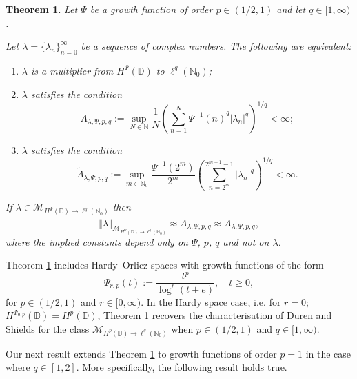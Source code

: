 \documentclass[a4paper, leqno, 10pt]{amsart}
\numberwithin{equation}{section}
\newtheorem{thm}{Theorem}
\newcommand{\norm}[1]{\left\Vert#1\right\Vert}
\newcommand{\D}{\mathbb{D}}
\newcommand{\N}{\mathbb{N}}
\begin{document}
\begin{thm}\label{gen_mult_p<1}
Let $\Psi$ be a growth function of order $p \in (1/2,1)$ and let $q \in [1, \infty)$. 

Let $\lambda = \{ \lambda_n \}_{n=0}^{\infty}$ be a sequence of complex numbers. The following are equivalent:
\begin{enumerate} 
\item  $\lambda$ is a multiplier from $H^{\Psi}(\D)$ to $\ell^q (\N_0)  $;
\item $\lambda$ satisfies the condition
\[
A_{\lambda, \Psi, p, q} := \sup_{N \in \N} \frac{1}{N} \left( \sum_{n=1}^N {\Psi^{-1}(n)}^q  |\lambda_n|^q \right)^{1/q} < \infty ;
\]
\item $\lambda$ satisfies the condition
\[
\widetilde{A}_{\lambda, \Psi, p,  q} := \sup_{m \in \N_0} \frac{\Psi^{-1}(2^m)} {2^m} \left( \sum_{n=2^m}^{2^{m+1}-1} |\lambda_n|^q \right)^{1/q} < \infty .
\]
\end{enumerate}
If $\lambda \in \mathcal{M}_{H^{\Psi}(\D) \rightarrow \ell^q (\N_0)}$ then
\[
\norm{ \lambda }_{\mathcal{M}_{H^{\Psi}(\D) \rightarrow \ell^q (\N_0)}} \approx A_{\lambda, \Psi, p, q} \approx \widetilde{A}_{\lambda, \Psi, p, q} ,
\]
where the implied constants depend only on $\Psi$, $p$, $q$ and not on $\lambda$. 
\end{thm}

Theorem \ref{gen_mult_p<1} includes Hardy--Orlicz spaces with growth functions of the form
\begin{equation}\label{Psi_r,p_def}
\Psi_{r,p} (t) := \frac{t^p}{\log^r (t+e)}, \quad t \geq 0, 
\end{equation}
for $p \in (1/2,1) $ and $r \in [0, \infty) $. In the Hardy space case, i.e. for $r=0$; $H^{\Psi_{0,p}} (\D) = H^p (\D)$, Theorem \ref{gen_mult_p<1} recovers the characterisation of Duren and Shields for the class $\mathcal{M}_{H^p(\D) \rightarrow \ell^q (\N_0)}$ when $p \in (1/2,1)$ and $q \in [1, \infty)$. 

Our next result extends Theorem \ref{gen_mult_p<1} to growth functions of order $p=1$ in the case where $q \in [1,2]$. More specifically, the following result holds true.
\end{document}
